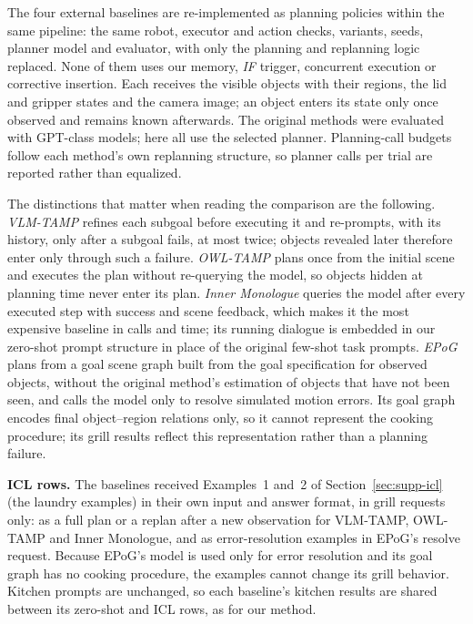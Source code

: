 The four external baselines are re-implemented as planning policies within the same pipeline: the same robot,
executor and action checks, variants, seeds, planner model and evaluator, with only the planning and replanning
logic replaced. None of them uses our memory, \textit{IF} trigger, concurrent execution or corrective insertion.
Each receives the visible objects with their regions, the lid and gripper states and the camera image; an
object enters its state only once observed and remains known afterwards. The original methods were evaluated
with GPT-class models; here all use the selected planner. Planning-call budgets follow each method's own
replanning structure, so planner calls per trial are reported rather than equalized.

The distinctions that matter when reading the comparison are the following. \emph{VLM-TAMP} refines each
subgoal before executing it and re-prompts, with its history, only after a subgoal fails, at most twice; objects
revealed later therefore enter only through such a failure. \emph{OWL-TAMP} plans once from the initial scene
and executes the plan without re-querying the model, so objects hidden at planning time never enter its plan.
\emph{Inner Monologue} queries the model after every executed step with success and scene feedback, which makes
it the most expensive baseline in calls and time; its running dialogue is embedded in our zero-shot prompt
structure in place of the original few-shot task prompts. \emph{EPoG} plans from a goal scene graph built from
the goal specification for observed objects, without the original method's estimation of objects that have not
been seen, and calls the model only to resolve simulated motion errors. Its goal graph encodes final
object--region relations only, so it cannot represent the cooking procedure; its grill results reflect this
representation rather than a planning failure.

\noindent\textbf{ICL rows.} The baselines received Examples~1 and~2 of Section~\ref{sec:supp-icl} (the laundry
examples) in their own input and answer format, in grill requests only: as a full plan or a replan after a new
observation for VLM-TAMP, OWL-TAMP and Inner Monologue, and as error-resolution examples in EPoG's resolve
request. Because EPoG's model is used only for error resolution and its goal graph has no cooking procedure,
the examples cannot change its grill behavior. Kitchen prompts are unchanged, so each baseline's kitchen results
are shared between its zero-shot and ICL rows, as for our method.
